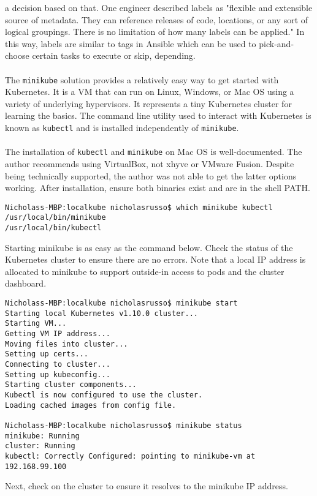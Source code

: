 a decision based on that. One engineer described labels as "flexible and
extensible source of metadata. They can reference releases of code, locations,
or any sort of logical groupings. There is no limitation of how many labels
can be applied." In this way, labels are similar to tags in Ansible which can
be used to pick-and-choose certain tasks to execute or skip, depending.
\\ \\
The \verb|minikube| solution provides a relatively easy way to get started
with Kubernetes. It is a VM that can run on Linux, Windows, or Mac OS using a
variety of underlying hypervisors. It represents a tiny Kubernetes cluster for
learning the basics. The command line utility used to interact with Kubernetes
is known as \verb|kubectl| and is installed independently of \verb|minikube|.
\\ \\
The installation of \verb|kubectl| and \verb|minikube| on Mac OS is
well-documented. The author recommends using VirtualBox, not xhyve or VMware
Fusion. Despite being technically supported, the author was not able to get
the latter options working. After installation, ensure both binaries exist and
are in the shell PATH.

\begin{verbatim}
Nicholass-MBP:localkube nicholasrusso$ which minikube kubectl
/usr/local/bin/minikube
/usr/local/bin/kubectl
\end{verbatim}

Starting minikube is as easy as the command below. Check the status of the
Kubernetes cluster to ensure there are no errors. Note that a local IP address
is allocated to minikube to support outside-in access to pods and the cluster
dashboard.

\begin{verbatim}
Nicholass-MBP:localkube nicholasrusso$ minikube start
Starting local Kubernetes v1.10.0 cluster...
Starting VM...
Getting VM IP address...
Moving files into cluster...
Setting up certs...
Connecting to cluster...
Setting up kubeconfig...
Starting cluster components...
Kubectl is now configured to use the cluster.
Loading cached images from config file.

Nicholass-MBP:localkube nicholasrusso$ minikube status
minikube: Running
cluster: Running
kubectl: Correctly Configured: pointing to minikube-vm at 192.168.99.100
\end{verbatim}

Next, check on the cluster to ensure it resolves to the minikube IP address.

